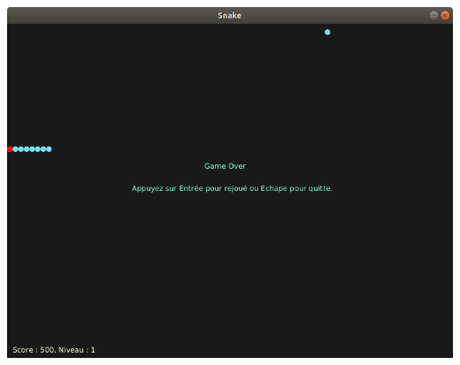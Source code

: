 \documentclass[a4paper]{report}
\begin{document}
\begin{onehalfspace} 
\begin{description}
\begin{center}
     \includegraphics[width=13.5cm]{exp2.png}
\end{center}
\end{description}
\end{onehalfspace} 
\end{document}
